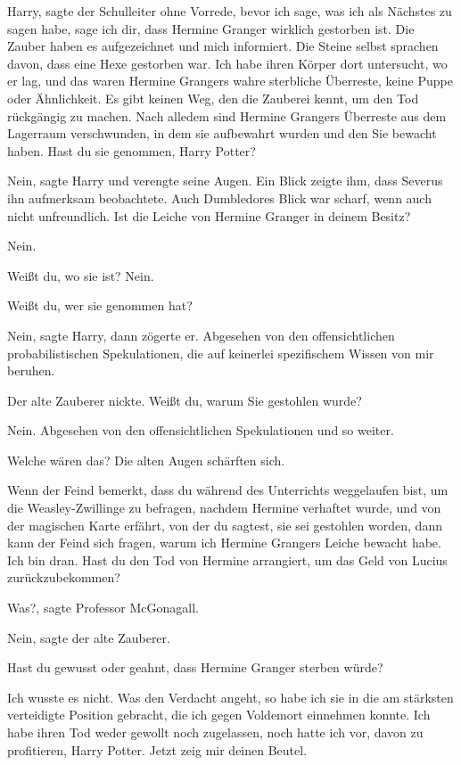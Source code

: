 \glqq{}Harry\grqq{}, sagte der Schulleiter ohne Vorrede, \glqq{}bevor ich sage,
was ich als Nächstes zu sagen habe, sage ich dir, dass Hermine Granger wirklich
gestorben ist. Die Zauber haben es aufgezeichnet und mich informiert. Die Steine
selbst sprachen davon, dass eine Hexe gestorben war. Ich habe ihren Körper dort
untersucht, wo er lag, und das waren Hermine Grangers wahre sterbliche
Überreste, keine Puppe oder Ähnlichkeit. Es gibt keinen Weg, den die Zauberei
kennt, um den Tod rückgängig zu machen. Nach alledem sind Hermine Grangers
Überreste aus dem Lagerraum verschwunden, in dem sie aufbewahrt wurden und den
Sie bewacht haben. Hast du sie genommen, Harry Potter?\grqq{}

\glqq{}Nein\grqq{}, sagte Harry und verengte seine Augen. Ein Blick zeigte ihm,
dass Severus ihn aufmerksam beobachtete. Auch Dumbledores Blick war scharf, wenn
auch nicht unfreundlich. \glqq{}Ist die Leiche von Hermine Granger in deinem
Besitz?\grqq{}

\glqq{}Nein.\grqq{}

\glqq{}Weißt du, wo sie ist?\grqq{} \glqq{}Nein.\grqq{}

\glqq{} Weißt du, wer sie genommen hat?\grqq{}

\glqq{}Nein\grqq{}, sagte Harry, dann zögerte er. \glqq{}Abgesehen von den
offensichtlichen probabilistischen Spekulationen, die auf keinerlei spezifischem
Wissen von mir beruhen.\grqq{}

Der alte Zauberer nickte. \glqq{} Weißt du, warum Sie gestohlen wurde?\grqq{}

\glqq{}Nein. Abgesehen von den offensichtlichen Spekulationen und so
weiter.\grqq{}

\glqq{}Welche wären das?\grqq{} Die alten Augen schärften sich.

\glqq{}Wenn der Feind bemerkt, dass du während des Unterrichts weggelaufen bist,
um die Weasley-Zwillinge zu befragen, nachdem Hermine verhaftet wurde, und von
der magischen Karte erfährt, von der du sagtest, sie sei gestohlen worden, dann
kann der Feind sich fragen, warum ich Hermine Grangers Leiche bewacht habe. Ich
bin dran. Hast du den Tod von Hermine arrangiert, um das Geld von Lucius
zurückzubekommen?\grqq{}

\glqq{}Was?\grqq{}, sagte Professor McGonagall.

\glqq{}Nein\grqq{}, sagte der alte Zauberer.

\glqq{}Hast du gewusst oder geahnt, dass Hermine Granger sterben würde?\grqq{}

\glqq{}Ich wusste es nicht. Was den Verdacht angeht, so habe ich sie in die am
stärksten verteidigte Position gebracht, die ich gegen Voldemort einnehmen
konnte. Ich habe ihren Tod weder gewollt noch zugelassen, noch hatte ich vor,
davon zu profitieren, Harry Potter. Jetzt zeig mir deinen Beutel.\grqq{}

